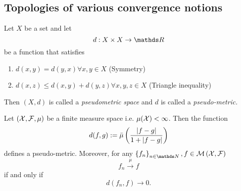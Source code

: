 \subsection{Topologies of various convergence notions}
\begin{defn}
\label{def:pseudoMetric}Let $X$ be a set and let 
\[
d:X\times X\to\R
\]
be a function that satisfies\begin{enumerate}[label=(\roman*),leftmargin=.1\linewidth,rightmargin=.4\linewidth]
	\item $ d(x,y) = d(y,x) \forall x,y \in X$ (Symmetry)
	\item $ d(x,z) \leq d(x,y) + d(y,z) \forall x,y,z \in X $ (Triangle inequality)
\end{enumerate}

Then $(X,d)$ is called a \emph{pseudometric space }and $d$ is called
a \emph{pseudo-metric.}
\end{defn}

\begin{prop}
\label{prop:pseudoMetricConvMeasure}Let $\left(\mathcal{X},\mathcal{F},\mu\right)$
be a finite measure space i.e. $\mu(\mathcal{X})<\infty$. Then the function
\[
d(f,g):=\bar{\mu}\left(\frac{\lvert f-g\rvert}{1+\lvert f-g\rvert}\right)
\]
defines a pseudo-metric. Moreover, for any $\left\{ f_{n}\right\} _{n\in\N},f\in\measurableFunctions$
\[
f_{n}\stackrel{\mu}{\longrightarrow}f
\]
if and only if
\[
d(f_{n},f)\longrightarrow0.
\]
\end{prop}

